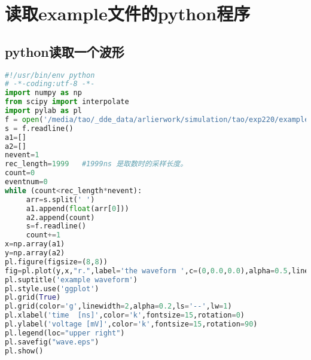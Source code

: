 \documentclass{elegantbook}
\begin{document}
%
%

\nocite{EINAV2010,Havrylchyk2018} 

%
%

\appendix
\chapter{读取example文件的python程序}

\section{python读取一个波形}
\begin{lstlisting}[label={lst:simple},language=python]
#!/usr/bin/env python
# -*-coding:utf-8 -*-
import numpy as np
from scipy import interpolate
import pylab as pl
f = open('/media/tao/_dde_data/arlierwork/simulation/tao/exp220/example.lvm') #换成你自己的文件名
s = f.readline()
a1=[]
a2=[]
nevent=1
rec_length=1999   #1999ns 是取数时的采样长度。
count=0
eventnum=0
while (count<rec_length*nevent):  
     arr=s.split(' ')
     a1.append(float(arr[0]))
     a2.append(count)
     s=f.readline()
     count+=1
x=np.array(a1)
y=np.array(a2)
pl.figure(figsize=(8,8))
fig=pl.plot(y,x,"r.",label='the waveform ',c=(0,0.0,0.0),alpha=0.5,linestyle='-')
pl.suptitle('example waveform')
pl.style.use('ggplot')
pl.grid(True)
pl.grid(color='g',linewidth=2,alpha=0.2,ls='--',lw=1)
pl.xlabel('time  [ns]',color='k',fontsize=15,rotation=0) 
pl.ylabel('voltage [mV]',color='k',fontsize=15,rotation=90) 
pl.legend(loc="upper right")
pl.savefig("wave.eps")
pl.show()
\end{lstlisting}
\end{document}
